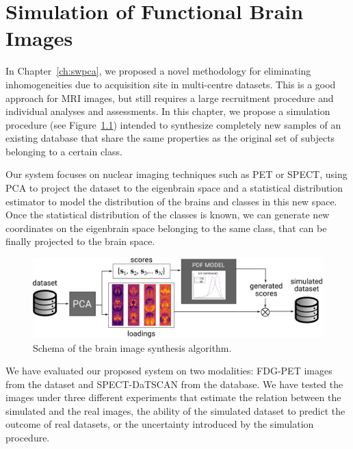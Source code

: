 \chapter{Simulation of Functional Brain Images}\label{ch:simulation}
In Chapter~\ref{ch:swpca}, we proposed a novel methodology for eliminating inhomogeneities due to acquisition site in multi-centre datasets. This is a good approach for \ac{MRI} images, but still requires a large recruitment procedure and individual analyses and assessments. In this chapter, we propose a simulation procedure (see Figure~\ref{fig:simulationSchema}) intended to synthesize completely new samples of an existing database that share the same properties as the original set of subjects belonging to a certain class.  

Our system focuses on nuclear imaging techniques such as \ac{PET} or \ac{SPECT}, using \ac{PCA} to project the dataset to the eigenbrain space and a statistical distribution estimator to model the distribution of the brains and classes in this new space. Once the statistical distribution of the classes is known, we can generate new coordinates on the eigenbrain space belonging to the same class, that can be finally projected to the brain space.
 
\begin{figure}[htp]
	\centering
	\includegraphics[width=\textwidth]{Graphics/ch8/SchemaGeneration}
	\caption{Schema of the brain image synthesis algorithm.}
	\label{fig:simulationSchema}
\end{figure} 

We have evaluated our proposed system on two modalities: FDG-\ac{PET} images from the \adnipet{} dataset and \ac{SPECT}-DaTSCAN from the \ppmidat{} database. We have tested the images under three different experiments that estimate the relation between the simulated and the real images, the ability of the simulated dataset to predict the outcome of real datasets, or the uncertainty introduced by the simulation procedure. 

